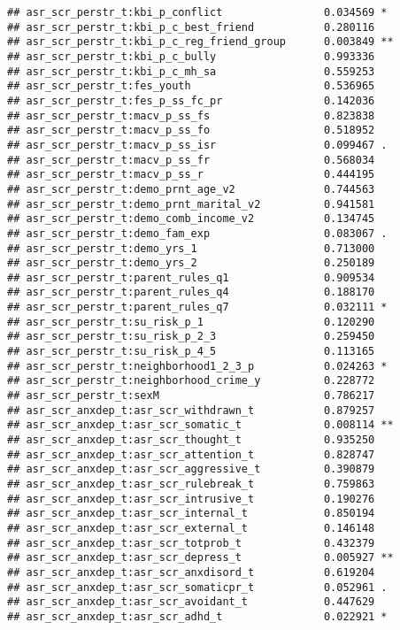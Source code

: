 \documentclass[
]{article}
\begin{document}
\begin{verbatim}
## asr_scr_perstr_t:kbi_p_conflict                0.034569 *  
## asr_scr_perstr_t:kbi_p_c_best_friend           0.280116    
## asr_scr_perstr_t:kbi_p_c_reg_friend_group      0.003849 ** 
## asr_scr_perstr_t:kbi_p_c_bully                 0.993336    
## asr_scr_perstr_t:kbi_p_c_mh_sa                 0.559253    
## asr_scr_perstr_t:fes_youth                     0.536965    
## asr_scr_perstr_t:fes_p_ss_fc_pr                0.142036    
## asr_scr_perstr_t:macv_p_ss_fs                  0.823838    
## asr_scr_perstr_t:macv_p_ss_fo                  0.518952    
## asr_scr_perstr_t:macv_p_ss_isr                 0.099467 .  
## asr_scr_perstr_t:macv_p_ss_fr                  0.568034    
## asr_scr_perstr_t:macv_p_ss_r                   0.444195    
## asr_scr_perstr_t:demo_prnt_age_v2              0.744563    
## asr_scr_perstr_t:demo_prnt_marital_v2          0.941581    
## asr_scr_perstr_t:demo_comb_income_v2           0.134745    
## asr_scr_perstr_t:demo_fam_exp                  0.083067 .  
## asr_scr_perstr_t:demo_yrs_1                    0.713000    
## asr_scr_perstr_t:demo_yrs_2                    0.250189    
## asr_scr_perstr_t:parent_rules_q1               0.909534    
## asr_scr_perstr_t:parent_rules_q4               0.188170    
## asr_scr_perstr_t:parent_rules_q7               0.032111 *  
## asr_scr_perstr_t:su_risk_p_1                   0.120290    
## asr_scr_perstr_t:su_risk_p_2_3                 0.259450    
## asr_scr_perstr_t:su_risk_p_4_5                 0.113165    
## asr_scr_perstr_t:neighborhood1_2_3_p           0.024263 *  
## asr_scr_perstr_t:neighborhood_crime_y          0.228772    
## asr_scr_perstr_t:sexM                          0.786217    
## asr_scr_anxdep_t:asr_scr_withdrawn_t           0.879257    
## asr_scr_anxdep_t:asr_scr_somatic_t             0.008114 ** 
## asr_scr_anxdep_t:asr_scr_thought_t             0.935250    
## asr_scr_anxdep_t:asr_scr_attention_t           0.828747    
## asr_scr_anxdep_t:asr_scr_aggressive_t          0.390879    
## asr_scr_anxdep_t:asr_scr_rulebreak_t           0.759863    
## asr_scr_anxdep_t:asr_scr_intrusive_t           0.190276    
## asr_scr_anxdep_t:asr_scr_internal_t            0.850194    
## asr_scr_anxdep_t:asr_scr_external_t            0.146148    
## asr_scr_anxdep_t:asr_scr_totprob_t             0.432379    
## asr_scr_anxdep_t:asr_scr_depress_t             0.005927 ** 
## asr_scr_anxdep_t:asr_scr_anxdisord_t           0.619204    
## asr_scr_anxdep_t:asr_scr_somaticpr_t           0.052961 .  
## asr_scr_anxdep_t:asr_scr_avoidant_t            0.447629    
## asr_scr_anxdep_t:asr_scr_adhd_t                0.022921 *  

\end{verbatim}
\end{document}
